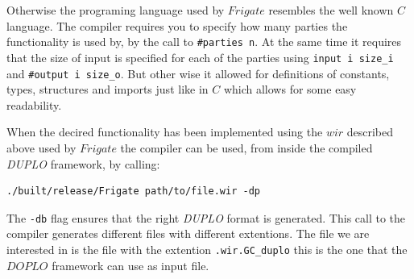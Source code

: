 \documentclass[twoside,11pt,openright]{report}
\newcommand{\DUPLO}{\textit{DUPLO} }
\begin{document}
Otherwise the programing language used by $Frigate$ resembles the well known $C$ language. The compiler requires you to specify how many parties the functionality is used by, by the call to \verb|#parties n|. At the same time it requires that the size of input is specified for each of the parties using \verb|input i size_i| and \verb|#output i size_o|. But other wise it allowed for definitions of constants, types, structures and imports just like in $C$ which allows for some easy readability.

\bigskip

When the decired functionality has been implemented using the $wir$ described above used by $Frigate$ the compiler can be used, from inside the compiled \DUPLO framework, by calling:

\begin{center}
\begin{verbatim}
./built/release/Frigate path/to/file.wir -dp
\end{verbatim}
\end{center}

The \verb|-db| flag ensures that the right \DUPLO format is generated. This call to the compiler generates different files with different extentions. The file we are interested in is the file with the extention \verb|.wir.GC_duplo| this is the one that the $DOPLO$ framework can use as input file.

\bigskip
\end{document}
